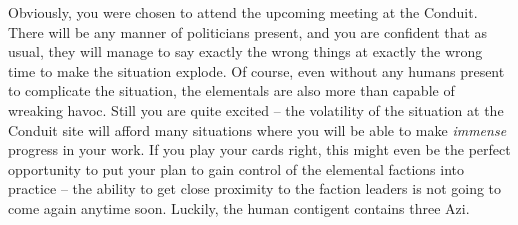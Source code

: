 \documentclass[char]{elementals}
\begin{document}
Obviously, you were chosen to attend the upcoming meeting at the Conduit. There will be any manner of politicians present, and you are confident that as usual, they will manage to say exactly the wrong things at exactly the wrong time to make the situation explode. Of course, even without any humans present to complicate the situation, the elementals are also more than capable of wreaking havoc. Still you are quite excited -- the volatility of the situation at the Conduit site will afford many situations where you will be able to make \emph{immense} progress in your work. If you play your cards right, this might even be the perfect opportunity to put your plan to gain control of the elemental factions into practice -- the ability to get close proximity to the faction leaders is not going to come again anytime soon. Luckily, the human contigent contains three Azi.
\end{document}
